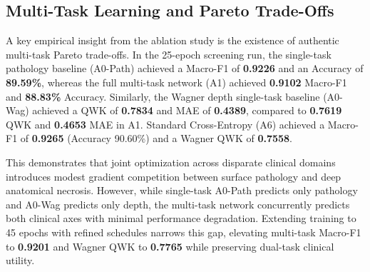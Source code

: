 \documentclass[journal]{IEEEtran}
\begin{document}
\subsection{Multi-Task Learning and Pareto Trade-Offs}
A key empirical insight from the ablation study is the existence of authentic multi-task Pareto trade-offs. In the 25-epoch screening run, the single-task pathology baseline (A0-Path) achieved a Macro-F1 of \textbf{0.9226} and an Accuracy of \textbf{89.59\%}, whereas the full multi-task network (A1) achieved \textbf{0.9102} Macro-F1 and \textbf{88.83\%} Accuracy. Similarly, the Wagner depth single-task baseline (A0-Wag) achieved a QWK of \textbf{0.7834} and MAE of \textbf{0.4389}, compared to \textbf{0.7619} QWK and \textbf{0.4653} MAE in A1. Standard Cross-Entropy (A6) achieved a Macro-F1 of \textbf{0.9265} (Accuracy 90.60\%) and a Wagner QWK of \textbf{0.7558}. 

This demonstrates that joint optimization across disparate clinical domains introduces modest gradient competition between surface pathology and deep anatomical necrosis. However, while single-task A0-Path predicts only pathology and A0-Wag predicts only depth, the multi-task network concurrently predicts both clinical axes with minimal performance degradation. Extending training to 45 epochs with refined schedules narrows this gap, elevating multi-task Macro-F1 to \textbf{0.9201} and Wagner QWK to \textbf{0.7765} while preserving dual-task clinical utility.
\end{document}
